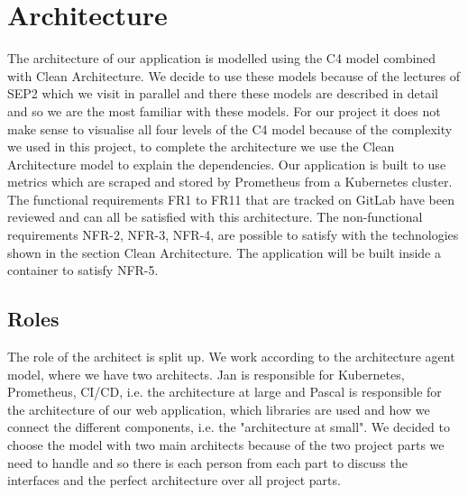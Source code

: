 \chapter{Architecture}



The architecture of our application is modelled using the C4 model combined with Clean Architecture. We decide to use these models because of the lectures of SEP2 which we visit in parallel and there these models are described in detail and so we are the most familiar with these models. For our project it does not make sense to visualise all four levels of the C4 model because of the complexity we used in this project, to complete the architecture we use the Clean Architecture model to explain the dependencies.
Our application is built to use metrics which are scraped and stored by Prometheus from a Kubernetes cluster.
The functional requirements FR1 to FR11 that are tracked on GitLab have been reviewed and can all be satisfied with this architecture.
The non-functional requirements NFR-2, NFR-3, NFR-4, are possible to satisfy with the technologies shown in the section Clean Architecture.
The application will be built inside a container to satisfy NFR-5.

\section{Roles}
The role of the architect is split up. We work according to the architecture agent model, where we have two architects.
Jan is responsible for Kubernetes, Prometheus, CI/CD, i.e. the architecture at large
and Pascal is responsible for the architecture of our web application, which libraries are used and how we connect the different components, i.e. the "architecture at small". We decided to choose the model with two main architects because of the two project parts we need to handle and so there is each person from each part to discuss the interfaces and the perfect architecture over all project parts.

